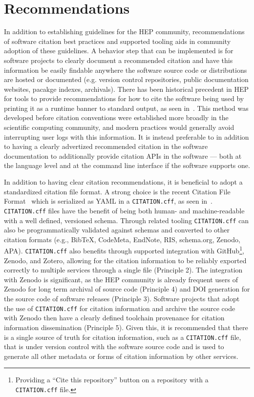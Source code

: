 \section{Recommendations}\label{sec:recommendations}

In addition to establishing guidelines for the HEP community, recommendations of software citation best practices and supported tooling aids in community adoption of these guidelines.
A behavior step that can be implemented is for software projects to clearly document a recommended citation and have this information be easily findable anywhere the software source code or distributions are hosted or documented (e.g. version control repositories, public documentation websites, pacakge indexes, archivals).
There has been historical precedent in HEP for tools to provide recommendations for how to cite the software being used by printing it as a runtime banner to standard output, as seen in~.
This method was developed before citation conventions were established more broadly in the scientific computing community, and modern practices would generally avoid interrupting user logs with this information.
It is instead preferable to in addition to having a clearly advertized recommended citation in the software documentation to additionally provide citation APIs in the software --- both at the language level and at the command line interface if the software supports one.

In addition to having clear citation recommendations, it is beneficial to adopt a standardized citation file format.
A strong choice is the recent Citation File Format~\cite{Druskat_Citation_File_Format_2021} which is serialized as YAML in a \texttt{CITATION.cff}, as seen in~.
\texttt{CITATION.cff} files have the benefit of being both human- and machine-readable with a well defined, versioned schema.
Through related tooling \texttt{CITATION.cff} can also be programmatically validated against schemas and converted to other citation formats (e.g., BibTeX, CodeMeta, EndNote, RIS, schema.org, Zenodo, APA).
\texttt{CITATION.cff} also benefits through supported integration with GitHub\footnote{Providing a ``Cite this repository'' button on a repository with a \texttt{CITATION.cff} file.}, Zenodo, and Zotero, allowing for the citation information to be reliably exported correctly to multiple services through a single file (Principle 2).
The integration with Zenodo is significant, as the HEP community is already frequent users of Zenodo for long term archival of source code (Principle 4) and DOI generation for the source code of software releases (Principle 3).
Software projects that adopt the use of \texttt{CITATION.cff} for citation information and archive the source code with Zenodo then have a clearly defined toolchain provenance for citation information dissemination (Principle 5).
Given this, it is recommended that there is a single source of truth for citation information, such as a \texttt{CITATION.cff} file, that is under version control with the software source code and is used to generate all other metadata or forms of citation information by other services.

